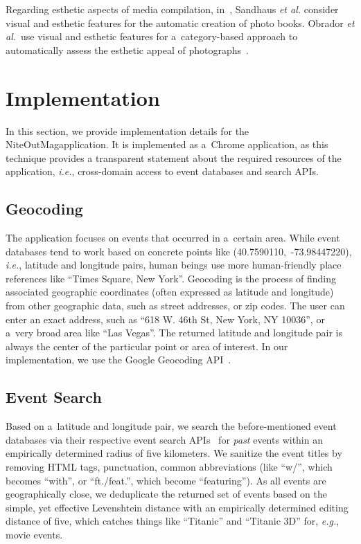 \documentclass{acm_proc_article-sp}
\let\oldemph\emph
\renewcommand{\emph}[1]{\oldemph{\fontsize{9}{9}\selectfont #1}}
\begin{document}
Regarding esthetic aspects of media compilation,
in~\cite{Sandhaus2011}, Sandhaus \emph{et al.} consider visual and
esthetic features for the automatic creation of photo books.
Obrador \emph{et al.}\ use visual and esthetic features
for a~category-based approach to automatically assess
the esthetic appeal of photographs~\cite{Obrador2012}.

\section{Implementation}
In this section, we provide implementation details for the
NiteOutMag\texttrademark application.
It is implemented as a~Chrome application, as this technique provides
a transparent statement about the required resources of the application,
\emph{i.e.}, cross-domain access to event databases and search APIs.

\subsection{Geocoding}
The application focuses on events that occurred in a~certain area.
While event databases tend to work based on concrete points like
\mbox{(40.7590110, -73.98447220)}, \emph{i.e.},
latitude and longitude pairs, human beings use more human-friendly place references
like ``Times Square, New York''.
Geocoding is the process of finding associated geographic coordinates
(often expressed as latitude and longitude) from other geographic data,
such as street addresses, or zip codes.
The user can enter an exact address, such as
``618 W. 46th St, New York, NY 10036'', or a~very broad area like ``Las Vegas''.
The returned latitude and longitude pair is always the center
of the particular point or area of interest.
In our implementation, we use the Google Geocoding API~\cite{Geocoding2012}.

\subsection{Event Search}
Based on a~latitude and longitude pair, we search the before-mentioned
event databases via their respective event search
APIs~\cite{Eventful2012,Foursquare2012,GooglePlaces2012,Upcoming2012}
for \emph{past} events within an empirically determined radius of five kilometers.
We sanitize the event titles by removing HTML tags, punctuation,
common abbreviations (like ``w/'', which becomes ``with'', or ``ft./feat.'',
which become ``featuring'').
As all events are geographically close, we deduplicate the returned set of events
based on the simple, yet effective Levenshtein distance
with an empirically determined editing distance of five,
which catches things like ``Titanic'' and ``Titanic 3D'' for, \emph{e.g.}, movie events.
\end{document}
